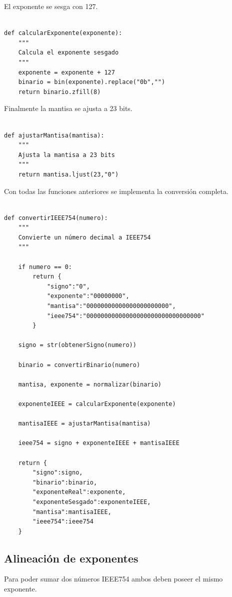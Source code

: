 \documentclass[11pt]{article}
\begin{document}
El exponente se sesga con 127.

\begin{verbatim}

def calcularExponente(exponente):
    """
    Calcula el exponente sesgado
    """
    exponente = exponente + 127
    binario = bin(exponente).replace("0b","")
    return binario.zfill(8)

\end{verbatim}

Finalmente la mantisa se ajusta a 23 bits.

\begin{verbatim}

def ajustarMantisa(mantisa):
    """
    Ajusta la mantisa a 23 bits
    """
    return mantisa.ljust(23,"0")

\end{verbatim}

Con todas las funciones anteriores se implementa la conversión completa.

\begin{verbatim}

def convertirIEEE754(numero):
    """
    Convierte un número decimal a IEEE754
    """

    if numero == 0:
        return {
            "signo":"0",
            "exponente":"00000000",
            "mantisa":"00000000000000000000000",
            "ieee754":"00000000000000000000000000000000"
        }

    signo = str(obtenerSigno(numero))

    binario = convertirBinario(numero)

    mantisa, exponente = normalizar(binario)

    exponenteIEEE = calcularExponente(exponente)

    mantisaIEEE = ajustarMantisa(mantisa)

    ieee754 = signo + exponenteIEEE + mantisaIEEE

    return {
        "signo":signo,
        "binario":binario,
        "exponenteReal":exponente,
        "exponenteSesgado":exponenteIEEE,
        "mantisa":mantisaIEEE,
        "ieee754":ieee754
    }

\end{verbatim}
\subsection{Alineación de exponentes}
\label{sec:org45ef5f5}

Para poder sumar dos números IEEE754 ambos deben poseer el mismo
exponente.
\end{document}
